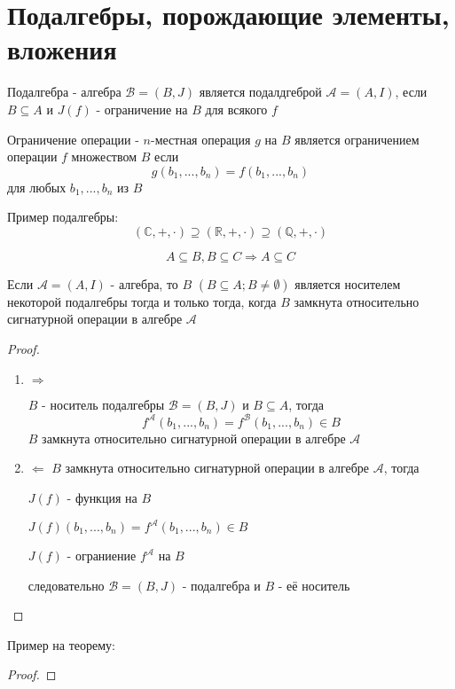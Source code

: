\documentclass[../main/document.tex]{subfiles}
\begin{document}
\section{Подалгебры, порождающие элементы, \\вложения}
\begin{dfn}
Подалгебра - алгебра $\mathcal{B}=(B,J)$ является подалдгеброй $\mathcal{A}=(A,I)$, если $B\subseteq A$ и $J(f)$ - ограничение на $B$ для всякого $f$
\end{dfn}
\begin{dfn}
Ограничение операции - $n$-местная операция $g$ на $B$ является ограничением операции $f$ множеством $B$ если 
$$g(b_1,...,b_n)=f(b_1,...,b_n)$$
для любых $b_1,...,b_n$ из $B$
\end{dfn}
\begin{exm}
Пример подалгебры:
$$(\mathbb{C},+,\cdot)\supseteq (\mathbb{R},+,\cdot)\supseteq (\mathbb{Q},+,\cdot)$$
\end{exm}
\begin{cnsq}
$$A\subseteq B, B\subseteq C \Rightarrow A\subseteq C$$
\end{cnsq}
\begin{thm}
Если $\mathcal{A}=(A,I)$ - алгебра, то $B$ $(B\subseteq A; B\neq \emptyset)$ является носителем некоторой подалгебры тогда и только тогда, когда $B$ замкнута относительно сигнатурной операции в алгебре $\mathcal{A}$
\begin{proof}
\begin{enumerate}
\item $\Rightarrow$

$B$ - носитель подалгебры $\mathcal{B}=(B,J)$ и $B\subseteq A$, тогда
$$f^{\mathcal{A}}(b_1,...,b_n)=f^{\mathcal{B}}(b_1,...,b_n)\in B$$
$B$ замкнута относительно сигнатурной операции в алгебре $\mathcal{A}$
\item $\Leftarrow$
$B$ замкнута относительно сигнатурной операции в алгебре $\mathcal{A}$, тогда

$J(f)$ - функция на $B$

$J(f)(b_1,...,b_n)=f^{\mathcal{A}}(b_1,...,b_n)\in B$

$J(f)$ - ограниение $f^{\mathcal{A}}$  на $B$

следовательно $\mathcal{B}=(B,J)$ - подалгебра и $B$ - её носитель
\end{enumerate}
\end{proof}
\end{thm}
\begin{exm}
Пример на теорему:

\end{exm}

\begin{thm}
\begin{proof}

\end{proof}
\end{thm}
\end{document}
